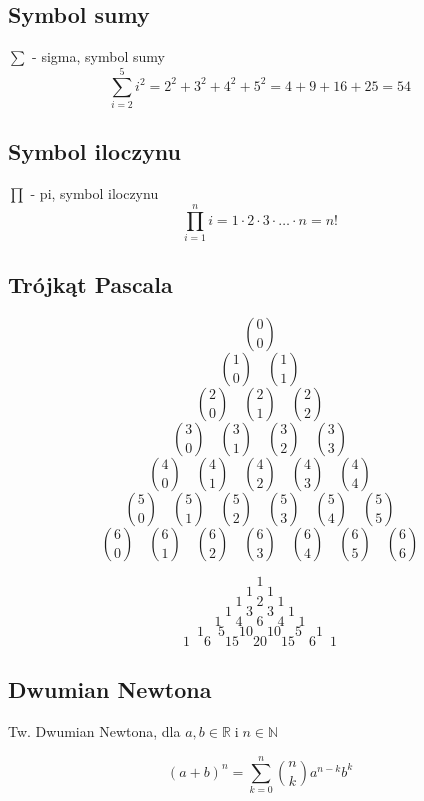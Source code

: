 \documentclass[../Matematyka.tex]{subfiles}
\begin{document}
    \subsection{Symbol sumy}
    \(\sum\) - sigma, symbol sumy
    \[\sum^{5}_{i=2} i^2 = 2^2 + 3^2 + 4^2 + 5^2 = 4 + 9 + 16 + 25 = 54\]

    \subsection{Symbol iloczynu}
    \(\prod\) - pi, symbol iloczynu
    \[\prod^{n}_{i=1} i = 1 \cdot 2 \cdot 3 \cdot \ldots \cdot n = n!\]

    \subsection{Trójkąt Pascala}

    \[\binom{0}{0}\]
    \[\binom{1}{0}\quad\binom{1}{1}\]
    \[\binom{2}{0}\quad\binom{2}{1}\quad\binom{2}{2}\]
    \[\binom{3}{0}\quad\binom{3}{1}\quad\binom{3}{2}\quad\binom{3}{3}\]
    \[\binom{4}{0}\quad\binom{4}{1}\quad\binom{4}{2}\quad\binom{4}{3}\quad\binom{4}{4}\]
    \[\binom{5}{0}\quad\binom{5}{1}\quad\binom{5}{2}\quad\binom{5}{3}\quad\binom{5}{4}\quad\binom{5}{5}\]
    \[\binom{6}{0}\quad\binom{6}{1}\quad\binom{6}{2}\quad\binom{6}{3}\quad\binom{6}{4}\quad\binom{6}{5}\quad\binom{6}{6}\]

    \[1\]
    \[1\quad1\]
    \[1\quad2\quad1\]
    \[1\quad3\quad3\quad1\]
    \[1\quad4\quad6\quad4\quad1\]
    \[1\quad5\quad10\quad10\quad5\quad1\]
    \[1\quad6\quad15\quad20\quad15\quad6\quad1\]

    \subsection{Dwumian Newtona}
    Tw. Dwumian Newtona, dla  \(a, b \in \mathbb{R} \;\text{i}\; n \in \mathbb{N}\)

    \[(a+b)^n = \sum^{n}_{k=0} \binom{n}{k}a^{n-k}b^k\]
\end{document}
